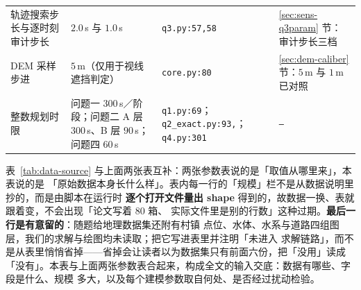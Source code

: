 \begin{table}[htbp]
\begin{tabularx}{\textwidth}{@{}>{\hsize=1.00\hsize}X >{\hsize=1.40\hsize}X >{\hsize=1.05\hsize}X >{\hsize=0.55\hsize}X@{}}
		轨迹搜索步长与逐时刻审计步长 & $2.0$\,s 与 $1.0$\,s & \texttt{q3.py:57,58} & \ref{sec:sens-q3param} 节：审计步长三档 \\
		DEM 采样步进 & $5$\,m（仅用于视线遮挡判定） & \texttt{core.py:80} & \ref{sec:dem-caliber} 节：$5$\,m 与 $1$\,m 已对照 \\
		整数规划时限 & 问题一 $300$\,s／阶段；问题二 A 层 $300$\,s、B 层 $90$\,s；问题四 $60$\,s & \texttt{q1.py:69}；\texttt{q2\_exact.py:93,\allowbreak 193}；\texttt{q4.py:301} & \texttt{---} \\
		\bottomrule
	\end{tabularx}
\end{table}



表~\ref{tab:data-source} 与上面两张表互补：两张参数表说的是「取值从哪里来」，本表说的是
「原始数据本身长什么样」。表内每一行的「规模」栏不是从数据说明里抄的，而是由脚本在运行时
\textbf{逐个打开文件量出 shape} 得到的，故数据一换、表就跟着变，不会出现「论文写着 80 箱、
实际文件里是别的行数」这种过期。\textbf{最后一行是有意留的}：随题给地理数据集还附有村镇
点位、水体、水系与道路四组图层，我们的求解与绘图均未读取；把它写进表里并注明「未进入
求解链路」，而不是从表里悄悄省掉——省掉会让读者以为数据集只有前面六份，把「没用」读成
「没有」。本表与上面两张参数表合起来，构成全文的输入交底：数据有哪些、字段是什么、规模
多大，以及每个建模参数取自何处、是否经过扰动检验。
